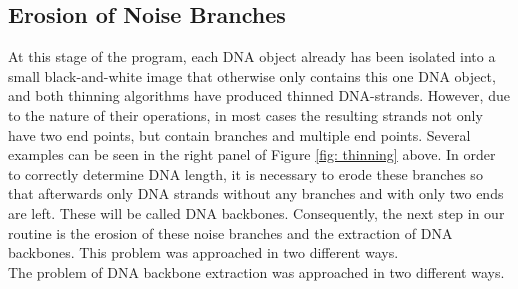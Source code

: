 \documentclass{article}
\begin{document}
\subsection{Erosion of Noise Branches}\label{sec:Erosion of Noise Branches}
At this stage of the program, each DNA object already has been isolated into a small black-and-white image that otherwise only contains this one DNA object, and both thinning algorithms have produced thinned DNA-strands. However, due to the nature of their operations, in most cases the resulting strands not only have two end points, but contain branches and multiple end points. Several examples can be seen in the right panel of Figure \ref{fig: thinning} above. In order to correctly determine DNA length, it is necessary to erode these branches so that afterwards only DNA strands without any branches and with only two ends are left. These will be called DNA backbones. Consequently, the next step in our routine is the erosion of these noise branches and the extraction of DNA backbones. This problem was approached in two different ways.\\

The problem of DNA backbone extraction was approached in two different ways.
\end{document}
